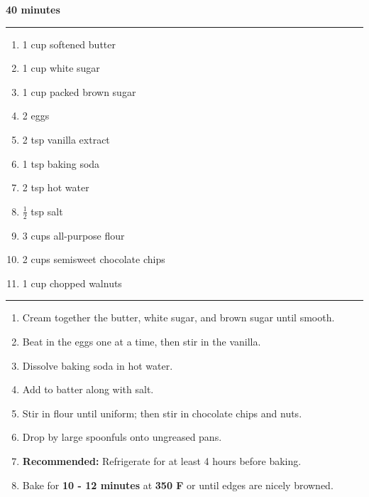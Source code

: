  \hfill {\large \textbf{40 minutes}}
\vspace{15pt}
\hrule
\vspace{15pt}
\begin{enumerate}
	\item 1 cup softened butter
	\item 1 cup white sugar
	\item 1 cup packed brown sugar
	\item 2 eggs
	\item 2 tsp vanilla extract
	\item 1 tsp baking soda
	\item 2 tsp hot water
	\item $\frac{1}{2}$ tsp salt
	\item 3 cups all-purpose flour
	\item 2 cups semisweet chocolate chips
	\item 1 cup chopped walnuts
\end{enumerate}
\vspace{15 pt}
\hrule
\vspace{15 pt}
\begin{enumerate}
	\item Cream together the butter, white sugar, and brown sugar until smooth.
	\item Beat in the eggs one at a time, then stir in the vanilla.
	\item Dissolve baking soda in hot water.
	\item Add to batter along with salt.
	\item Stir in flour until uniform; then stir in chocolate chips and nuts.
	\item Drop by large spoonfuls onto ungreased pans.
	\item \textbf{Recommended:} Refrigerate for at least 4 hours before baking.
	\item Bake for \textbf{10 - 12 minutes} at \textbf{350 F} or until edges are nicely browned.
\end{enumerate}
